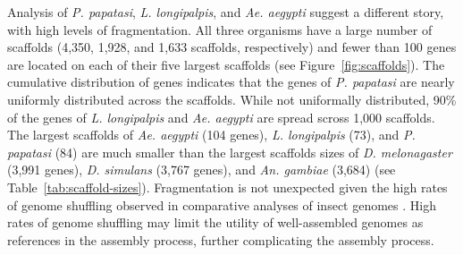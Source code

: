 Analysis of \emph{P. papatasi}, \emph{L. longipalpis}, and \emph{Ae. aegypti} suggest a different story, with high levels of fragmentation.  All three organisms have a large number of scaffolds (4,350, 1,928, and 1,633 scaffolds, respectively) and fewer than 100 genes are located on each of their five largest scaffolds (see Figure~\ref{fig:scaffolds}).  The cumulative distribution of genes indicates that the genes of \emph{P. papatasi} are nearly uniformly distributed across the scaffolds.  While not uniformally distributed, 90\% of the genes of \emph{L. longipalpis} and \emph{Ae. aegypti} are spread scross 1,000 scaffolds. The largest scaffolds of \emph{Ae. aegypti} (104 genes), \emph{L. longipalpis} (73), and \emph{P. papatasi} (84) are much smaller than the largest scaffolds sizes of \emph{D. melonagaster} (3,991 genes), \emph{D. simulans} (3,767 genes), and \emph{An. gambiae} (3,684) (see Table~\ref{tab:scaffold-sizes}). Fragmentation is not unexpected given the high rates of genome shuffling observed in comparative analyses of insect genomes \cite{Zdobnov2007,Ranz2001}.  High rates of genome shuffling may limit the utility of well-assembled genomes as references in the assembly process, further complicating the assembly process.


